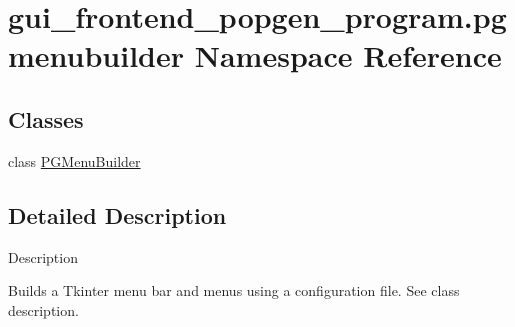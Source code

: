 \hypertarget{namespacegui__frontend__popgen__program_1_1pgmenubuilder}{}\section{gui\+\_\+frontend\+\_\+popgen\+\_\+program.\+pgmenubuilder Namespace Reference}
\label{namespacegui__frontend__popgen__program_1_1pgmenubuilder}
\subsection*{Classes}
\begin{DoxyCompactItemize}
\item 
class \hyperlink{classgui__frontend__popgen__program_1_1pgmenubuilder_1_1PGMenuBuilder}{P\+G\+Menu\+Builder}
\end{DoxyCompactItemize}


\subsection{Detailed Description}
\begin{DoxyVerb}Description

Builds a Tkinter menu bar and menus using a configuration file.  See class description.\end{DoxyVerb}
 